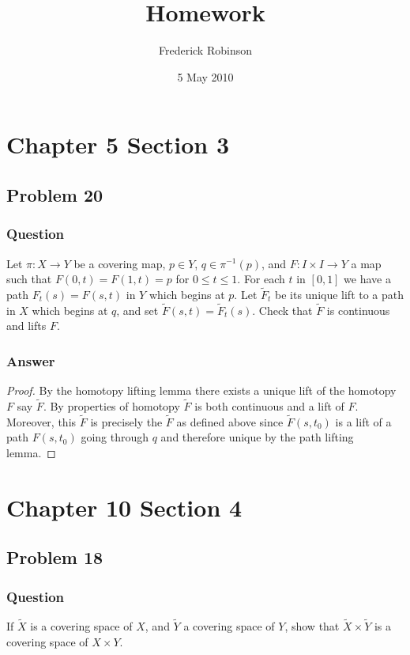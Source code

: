 \documentclass[10pt]{article}
\title{Homework}
\author{Frederick Robinson}
\date{5 May 2010}
\begin{document}

   \maketitle

\section{Chapter 5 Section 3}

\subsection{Problem 20}
\subsubsection{Question}
Let $\pi: X \to Y$ be a covering map, $p \in Y$, $q \in \pi^{-1}(p)$, and $F: I \times I \to Y$ a map such that $F(0,t)= F(1,t)=p$ for $0 \leq t \leq 1$. For each $t$ in $[0,1]$ we have a path $F_t(s)=F(s,t)$ in $Y$ which begins at $p$. Let $\tilde{F}_t$ be its unique lift to a path in $X$ which begins at $q$, and set $\tilde{F}(s,t)=\tilde{F}_t(s)$. Check that $\tilde{F}$ is continuous and lifts $F$.
\subsubsection{Answer}
\begin{proof}
By the homotopy lifting lemma there exists a unique lift of the homotopy $F$ say $\tilde{F}$. By properties of homotopy $\tilde{F}$ is both continuous and a lift of $F$. Moreover, this $\tilde{F}$ is precisely the $\tilde{F}$ as defined above since $\tilde{F}(s,t_0)$ is a lift of a path $F(s,t_0)$ going through $q$ and therefore unique by the path lifting lemma.
\end{proof}

\section{Chapter 10 Section 4}

\subsection{Problem 18}
\subsubsection{Question}
If $\tilde{X}$ is a covering space of $X$, and $\tilde{Y}$ a covering space of $Y$, show that $\tilde{X} \times \tilde{Y}$ is a covering space of $X \times Y$.
\end{document}
